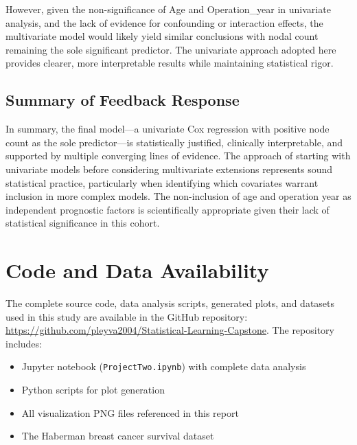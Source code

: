 \documentclass[12pt,a4paper]{article}
\begin{document}
However, given the non-significance of Age and Operation\_year in univariate analysis, and the lack of evidence for confounding or interaction effects, the multivariate model would likely yield similar conclusions with nodal count remaining the sole significant predictor. The univariate approach adopted here provides clearer, more interpretable results while maintaining statistical rigor.

\subsection{Summary of Feedback Response}

In summary, the final model—a univariate Cox regression with positive node count as the sole predictor—is statistically justified, clinically interpretable, and supported by multiple converging lines of evidence. The approach of starting with univariate models before considering multivariate extensions represents sound statistical practice, particularly when identifying which covariates warrant inclusion in more complex models. The non-inclusion of age and operation year as independent prognostic factors is scientifically appropriate given their lack of statistical significance in this cohort.

\section{Code and Data Availability}
\label{sec:code_availability}

The complete source code, data analysis scripts, generated plots, and datasets used in this study are available in the GitHub repository: \url{https://github.com/pleyva2004/Statistical-Learning-Capstone}. The repository includes:
\begin{itemize}
    \item Jupyter notebook (\texttt{ProjectTwo.ipynb}) with complete data analysis
    \item Python scripts for plot generation
    \item All visualization PNG files referenced in this report
    \item The Haberman breast cancer survival dataset
\end{itemize}
\end{document}
